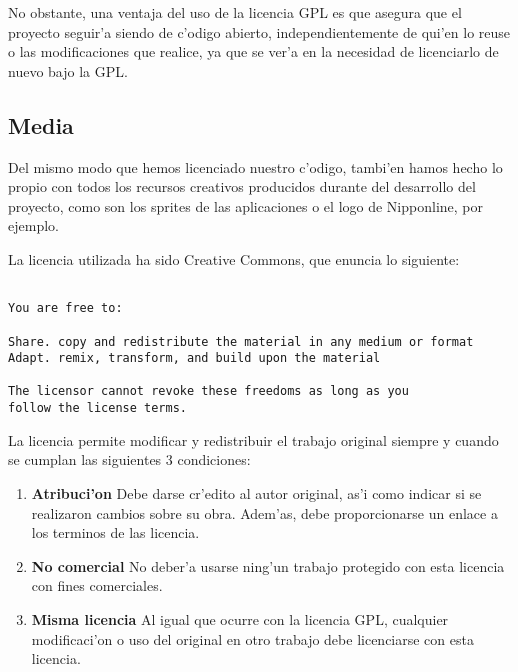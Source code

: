 No obstante, una ventaja del uso de la licencia GPL es que asegura que el proyecto seguir'a siendo de c'odigo abierto, 
independientemente de qui'en lo reuse o las modificaciones que realice, ya que se ver'a en la necesidad de licenciarlo 
de nuevo bajo la GPL.

\subsection{Media}
\label{sub:licencia_media}

Del mismo modo que hemos licenciado nuestro c'odigo, tambi'en hamos hecho lo propio con todos los recursos creativos 
producidos durante del desarrollo del proyecto, como son los sprites de las aplicaciones o el logo de Nipponline, 
por ejemplo.

La licencia utilizada ha sido Creative Commons\cite{creativecommons}, que enuncia lo siguiente:

\begin{verbatim}

You are free to:

Share. copy and redistribute the material in any medium or format
Adapt. remix, transform, and build upon the material

The licensor cannot revoke these freedoms as long as you
follow the license terms.

\end{verbatim}

La licencia permite modificar y redistribuir el trabajo original siempre y cuando se cumplan las siguientes 3 
condiciones:

\begin{enumerate}
\item \textbf{Atribuci'on} Debe darse cr'edito al autor original, as'i como indicar si se realizaron cambios sobre su 
obra. Adem'as, debe proporcionarse un enlace a los terminos de las licencia.
\item \textbf{No comercial} No deber'a usarse ning'un trabajo protegido con esta licencia con fines comerciales.
\item \textbf{Misma licencia} Al igual que ocurre con la licencia GPL, cualquier modificaci'on o uso del original en 
otro trabajo debe licenciarse con esta licencia.
\end{enumerate}

